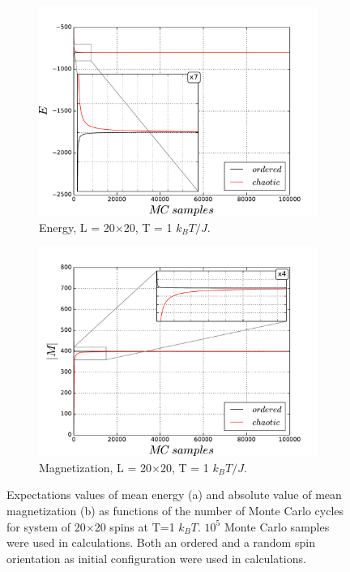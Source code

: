 \documentclass[10pt]{article}
\begin{document}
\newpage
\begin{figure}
\centering
   \begin{subfigure}[b]{1\textwidth}
   \includegraphics[width=0.9\linewidth]{20x20_10_5_1_energy}
   \caption{Energy, L = 20$\times$20, T = 1 $k_BT/J$.}
   \label{fig:energy_1k} 
\end{subfigure}

\begin{subfigure}[b]{1\textwidth}
   \includegraphics[width=0.9\linewidth]{20x20_10_5_1_magnet}
   \caption{Magnetization, L = 20$\times$20, T = 1 $k_BT/J$.}
   \label{fig:magnetization_1k}
\end{subfigure}

\caption[Two numerical solutions]{Expectations values of mean energy (a)  and absolute value of mean magnetization (b) as functions
of the number of Monte Carlo cycles for system of 20$\times$20 spins at T=1 $k_BT$. $10^5$ Monte Carlo samples were used in calculations.
Both an ordered and a random spin orientation as initial configuration were used in calculations.}
\end{figure}
\end{document}
